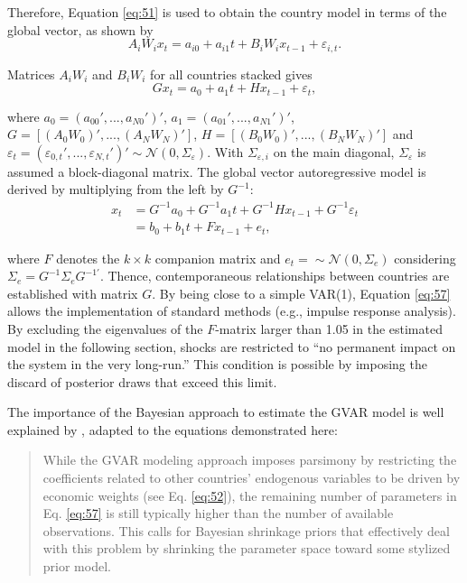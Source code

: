 \documentclass[a4paper, twoside]{templates/ociamthesis}
\begin{document}
Therefore, Equation \eqref{eq:51} is used to obtain the country model in terms of the global vector, as shown by
\begin{equation}
A_iW_ix_t = a_{i0} + a_{i1}t + B_iW_ix_{t-1} + \varepsilon_{i,t}.
\label{eq:55}
\end{equation}

Matrices \(A_iW_i\) and \(B_iW_i\) for all countries stacked gives
\begin{equation}
Gx_t = a_{0} + a_{1}t + Hx_{t-1} + \varepsilon_{t},
\label{eq:56}
\end{equation}

\noindent where \(a_0 = (a_{00}', ..., a_{N0}')'\), \(a_1 = (a_{01}', ..., a_{N1}')'\), \(G = [(A_0W_0)', ..., (A_NW_N)']\), \(H = [(B_0W_0)', ..., (B_NW_N)']\) and \(\varepsilon_t = (\varepsilon_{0,t}', ..., \varepsilon_{N,t}')' \sim \mathcal{N} (0,\Sigma_\varepsilon)\). With \(\Sigma_{\varepsilon,i}\) on the main diagonal, \(\Sigma_\varepsilon\) is assumed a block-diagonal matrix. The global vector autoregressive model is derived by multiplying from the left by \(G^{-1}\):
\begin{equation}
  \begin{aligned}
x_t 
& = G^{-1}a_{0} + G^{-1}a_{1}t + G^{-1}Hx_{t-1} + G^{-1}\varepsilon_{t} \\
& = b_0 + b_1t + Fx_{t-1} + e_t,
  \end{aligned}
\label{eq:57}
\end{equation}

\noindent where \(F\) denotes the \(k \times k\) companion matrix and \(e_t = \sim \mathcal{N} (0,\Sigma_e)\) considering \(\Sigma_e = G^{-1} \Sigma_eG^{-1'}\). Thence, contemporaneous relationships between countries are established with matrix \(G\). By being close to a simple VAR(1), Equation \eqref{eq:57} allows the implementation of standard methods (e.g., impulse response analysis). By excluding the eigenvalues of the \(F\)-matrix larger than 1.05 in the estimated model in the following section, shocks are restricted to ``no permanent impact on the system in the very long-run.'' \autocite[ 170]{feldkircher2016} This condition is possible by imposing the discard of posterior draws that exceed this limit.

The importance of the Bayesian approach to estimate the GVAR model is well explained by \textcite[ 3]{feldkircher2020}, adapted to the equations demonstrated here:

\begin{quote}
While the GVAR modeling approach imposes parsimony by restricting the coeﬃcients related to other countries' endogenous variables to be driven by economic weights (see Eq. \eqref{eq:52}), the remaining number of parameters in Eq. \eqref{eq:57} is still typically higher than the number of available observations. This calls for Bayesian shrinkage priors that effectively deal with this problem by shrinking the parameter space toward some stylized prior model.
\end{quote}
\end{document}
